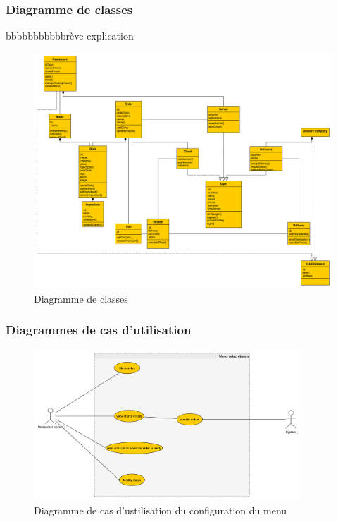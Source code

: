 \documentclass[french, a4paper, french]{report}
\begin{document}
		\newpage
		\subsubsection{Diagramme de classes}
			bbbbbbbbbbbrève explication
			
			\begin{figure}[!h]
  				\center
  				\includegraphics[width=15cm]{classdiag.png}
  				\caption{Diagramme de classes}
  				\label{fig:classdiag}
			\end{figure}
		\newpage
		\subsubsection{Diagrammes de cas d’utilisation}
			
			\begin{figure}[!h]
  				\center
  				\includegraphics[width=10cm]{usecasemenu.png}
  				\caption{Diagramme de cas d'ustilisation du configuration du menu}
  				\label{fig:usecasemenu}
			\end{figure}
			
\end{document}
